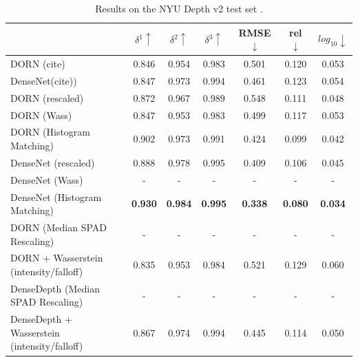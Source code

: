 \begin{table}
\begin{center}
\begin{tabular}{lccc|ccc}
  \toprule
    & $\delta^1 \uparrow$ & $\delta^2\uparrow$ & $\delta^3 \uparrow$ & RMSE $\downarrow$ & rel $\downarrow$ & $log_{10} \downarrow$ \\
  \midrule
  DORN (cite)&0.846&0.954&0.983&0.501&0.120&0.053 \\
DenseNet(cite))&0.847&0.973&0.994&0.461&0.123&0.054 \\
  \midrule
  DORN (rescaled) & 0.872 & 0.967 & 0.989 & 0.548 & 0.111 & 0.048 \\
  DORN (Wass) & 0.847 & 0.953 & 0.983 & 0.499 & 0.117 & 0.053 \\
  DORN (Histogram Matching) & 0.902 & 0.973 & 0.991 & 0.424 & 0.099 & 0.042 \\
  DenseNet (rescaled) &0.888 & 0.978&0.995&0.409&0.106&0.045 \\
  DenseNet (Wass) & - & - & - & - & - & - \\ 
  DenseNet (Histogram Matching) &\textbf{0.930} &\textbf{0.984}&\textbf{0.995}&\textbf{0.338}&\textbf{0.080}&\textbf{0.034}\\
  \midrule
  DORN (Median SPAD Rescaling) & - & - & - & - & - & - \\
  DORN + Wasserstein (intensity/falloff) & 0.835 & 0.953 & 0.984 & 0.521 & 0.129 & 0.060 \\
  DenseDepth (Median SPAD Rescaling) & - & - & - & - & - & - \\
  DenseDepth + Wasserstein (intensity/falloff) & 0.867 & 0.974 & 0.994 & 0.445 & 0.114 & 0.050 \\
  \midrule
  \bottomrule
\end{tabular} 
\end{center}
\caption{Results on the NYU Depth v2 test set \cite{nyudepth}.}
\end{table}

